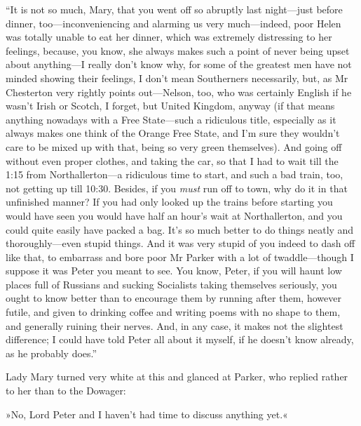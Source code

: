 \enquote{It is not so much, Mary, that you went off so abruptly last night\allowbreak---\allowbreak just before dinner, too\allowbreak---\allowbreak inconveniencing and alarming us very much\allowbreak---\allowbreak indeed, poor Helen was totally unable to eat her dinner, which was extremely distressing to her feelings, because, you know, she always makes such a point of never being upset about anything\allowbreak---\allowbreak I really don't know why, for some of the greatest men have not minded showing their feelings, I don't mean Southerners necessarily, but, as Mr  Chesterton very rightly points out\allowbreak---\allowbreak Nelson, too, who was certainly English if he wasn't Irish or Scotch, I forget, but United Kingdom, anyway (if that means anything nowadays with a Free State\allowbreak---\allowbreak such a ridiculous title, especially as it always makes one think of the Orange Free State, and I'm sure they wouldn't care to be mixed up with that, being so very green themselves). And going off without even proper clothes, and taking the car, so that I had to wait till the 1:15 from Northallerton\allowbreak---\allowbreak a ridiculous time to start, and such a bad train, too, not getting up till 10:30. Besides, if you \textit{must} run off to town, why do it in that unfinished manner? If you had only looked up the trains before starting you would have seen you would have half an hour's wait at Northallerton, and you could quite easily have packed a bag.  It's so much better to do things neatly and thoroughly\allowbreak---\allowbreak even stupid things. And it was very stupid of you indeed to dash off like that, to embarrass and bore poor Mr Parker with a lot of twaddle\allowbreak---\allowbreak though I suppose it was Peter you meant to see. You know, Peter, if you will haunt low places full of Russians and sucking Socialists taking themselves seriously, you ought to know better than to encourage them by running after them, however futile, and given to drinking coffee and writing poems with no shape to them, and generally ruining their nerves. And, in any case, it makes not the slightest difference; I could have told Peter all about it myself, if he doesn't know already, as he probably does.}

Lady Mary turned very white at this and glanced at Parker, who replied rather to her than to the Dowager:

»No, Lord Peter and I haven't had time to discuss anything yet.«

